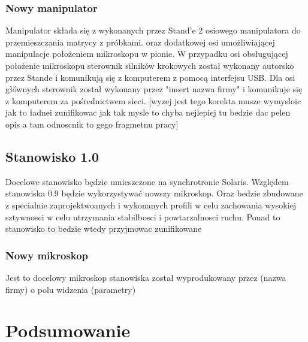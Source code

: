 \documentclass[11pt,a4paper]{article}
\begin{document}
    \subsubsection{Nowy manipulator}
    Manipulator składa się z wykonanych przez Stand'e 2 osiowego manipulatora do przemieszczania matrycy z próbkami. oraz dodatkowej osi umożliwiającej manipulacje położeniem mikroskopu w pionie. W przypadku osi obsługującej położenie mikroskopu sterownik silników krokowych został wykonany autorsko przez Stande i komunikują się z komputerem z pomocą interfejsu USB. Dla osi głównych sterownik został wykonany przez "insert nazwa firmy" i komunikuje się z komputerem za pośrednictwem sieci. [wyzej jest tego korekta musze wymysloic jak to ładnei zunifikowac jak tak mysle to chyba nejlepiej tu bedzie dac pelen opis a tam odnoscnik to gego fragmetnu pracy]

    \subsection{Stanowisko 1.0}
    Docelowe stanowisko będzie umieszczone na synchrotronie Solaris. Względem stanowiska 0.9 będzie wykorzystywać nowszy mikroskop. Oraz bedzie zbudowane z specialnie zaprojektwoanych i wykonanych profili w celu zachowania wysokiej sztywnosci w celu utrzymania stabilbosci i powtarzalnosci ruchu. Ponad to stanowisko to bedzie wtedy przyjmowac zunifikowane

    \subsubsection{Nowy mikroskop}
    Jest to docelowy mikroskop stanowiska został wyprodukowany przez (nazwa firmy) o polu widzenia (parametry)


    \section{Podsumowanie}
\end{document}
